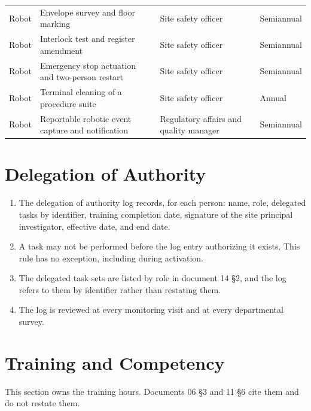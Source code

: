 \begin{mvltable}
\begin{xltabular}{\textwidth}{>{\raggedright\arraybackslash}p{2.2cm} >{\raggedright\arraybackslash}p{4.4cm} >{\raggedright\arraybackslash}p{2.4cm} >{\raggedright\arraybackslash}X}
Robot & Envelope survey and floor marking & Site safety officer & Semiannual \\
Robot & Interlock test and register amendment & Site safety officer & Semiannual \\
Robot & Emergency stop actuation and two-person restart & Site safety officer & Semiannual \\
Robot & Terminal cleaning of a procedure suite & Site safety officer & Annual \\
Robot & Reportable robotic event capture and notification & Regulatory affairs and quality manager & Semiannual \\
\end{xltabular}
\end{mvltable}

\section{Delegation of Authority}

\begin{enumerate}
\item The delegation of authority log records, for each person: name, role,
  delegated tasks by identifier, training completion date, signature of the site
  principal investigator, effective date, and end date.

\item A task may not be performed before the log entry authorizing it exists.
  This rule has no exception, including during activation.

\item The delegated task sets are listed by role in document 14 §2, and the log
  refers to them by identifier rather than restating them.

\item The log is reviewed at every monitoring visit and at every departmental
  survey.
\end{enumerate}

\section{Training and Competency}

This section owns the training hours. Documents 06 §3 and 11 §6 cite them and do
not restate them.

